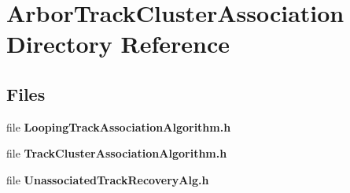 \section{Arbor\+Track\+Cluster\+Association Directory Reference}
\label{dir_ffe38f386ff5ca5c227e495a73254827}
\subsection*{Files}
\begin{DoxyCompactItemize}
\item 
file {\bf Looping\+Track\+Association\+Algorithm.\+h}
\item 
file {\bf Track\+Cluster\+Association\+Algorithm.\+h}
\item 
file {\bf Unassociated\+Track\+Recovery\+Alg.\+h}
\end{DoxyCompactItemize}
